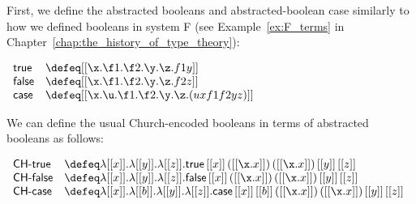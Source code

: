 \begin{example}
  \label{ex:FS-syn-red-case}
  First, we define the abstracted booleans and abstracted-boolean case
  similarly to how we defined booleans in system F (see
  Example~\ref{ex:F_terms} in
  Chapter~\ref{chap:the_history_of_type_theory}):
  \begin{center}
    \small
    \begin{math}
      \begin{array}{lll}
        \mathsf{true}     & \defeq [[\x.\f1.\f2.\y.\z.f1 y]]\\
        \mathsf{false}    & \defeq [[\x.\f1.\f2.\y.\z.f2 z]]\\
        \mathsf{case}     & \defeq [[\x.\u.\f1.\f2.\y.\z.(u x f1 f2 y z)]]\\
      \end{array}
    \end{math}
  \end{center}
  We can define the usual Church-encoded booleans in terms of
  abstracted booleans as follows:
  \begin{center}
    \small
    \begin{math}
      \begin{array}{lll}
        \textsf{CH-true}  & \defeq \lambda [[x]].\lambda [[y]].\lambda [[z]].\mathsf{true}\,[[x]]\,([[\x.x]])\,([[\x.x]])\,[[y]]\,[[z]]\\
        \textsf{CH-false} & \defeq \lambda [[x]].\lambda [[y]].\lambda [[z]].\mathsf{false}\,[[x]]\,([[\x.x]])\,([[\x.x]])\,[[y]]\,[[z]]\\
        \textsf{CH-case}  & \defeq \lambda [[x]].\lambda [[b]].\lambda [[y]].\lambda [[z]].\mathsf{case}\,[[x]]\,[[b]]\,([[\x.x]])\,([[\x.x]])\,[[y]]\,[[z]]\\
      \end{array}
    \end{math}
  \end{center}


\end{example}
